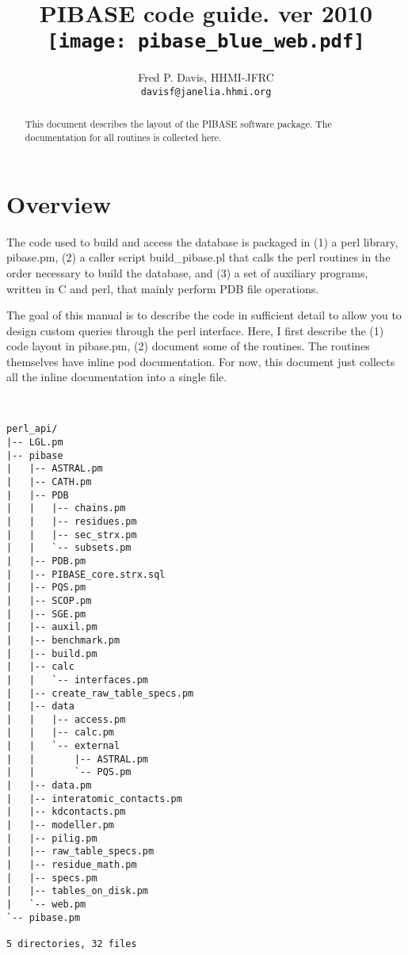 \documentclass{article}
\title{PIBASE code guide. ver 2010\\
\texttt{[image: pibase\_blue\_web.pdf]}}
\author{Fred P. Davis, HHMI-JFRC\\{\tt davisf@janelia.hhmi.org}}
\begin{document}
\maketitle

\begin{abstract}
This document describes the layout of the PIBASE software package. The documentation for all routines is collected here.
\end{abstract}

\section{Overview}

The code used to build and access the database is packaged in (1) a perl library, pibase.pm, (2) a caller script build\_pibase.pl that calls the perl routines in the order necessary to build the database, and (3) a set of auxiliary programs, written in C and perl, that mainly perform PDB file operations.

The goal of this manual is to describe the code in sufficient detail to allow you to design custom queries through the perl interface. Here, I first describe the (1) code layout in pibase.pm, (2) document some of the routines. The routines themselves have inline pod documentation. For now, this document just collects all the inline documentation into a single file.


\begin{verbatim}


perl_api/
|-- LGL.pm
|-- pibase
|   |-- ASTRAL.pm
|   |-- CATH.pm
|   |-- PDB
|   |   |-- chains.pm
|   |   |-- residues.pm
|   |   |-- sec_strx.pm
|   |   `-- subsets.pm
|   |-- PDB.pm
|   |-- PIBASE_core.strx.sql
|   |-- PQS.pm
|   |-- SCOP.pm
|   |-- SGE.pm
|   |-- auxil.pm
|   |-- benchmark.pm
|   |-- build.pm
|   |-- calc
|   |   `-- interfaces.pm
|   |-- create_raw_table_specs.pm
|   |-- data
|   |   |-- access.pm
|   |   |-- calc.pm
|   |   `-- external
|   |       |-- ASTRAL.pm
|   |       `-- PQS.pm
|   |-- data.pm
|   |-- interatomic_contacts.pm
|   |-- kdcontacts.pm
|   |-- modeller.pm
|   |-- pilig.pm
|   |-- raw_table_specs.pm
|   |-- residue_math.pm
|   |-- specs.pm
|   |-- tables_on_disk.pm
|   `-- web.pm
`-- pibase.pm

5 directories, 32 files
\end{verbatim}
\end{document}
